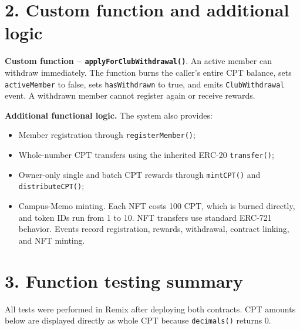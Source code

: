 \documentclass[9pt,a4paper]{article}
\newcommand{\code}[1]{\texttt{\small #1}}
\begin{document}
\section*{2. Custom function and additional logic}
\textbf{Custom function -- \code{applyForClubWithdrawal()}}. An active member can withdraw immediately. The function burns the caller's entire CPT balance, sets \code{activeMember} to false, sets \code{hasWithdrawn} to true, and emits \code{ClubWithdrawal} event. A withdrawn member cannot register again or receive rewards.

\textbf{Additional functional logic.} The system also provides: 

\begin{itemize}
  \item Member registration through \code{registerMember()}; 
  \item Whole-number CPT transfers using the inherited ERC-20 \code{transfer()}; 
  \item Owner-only single and batch CPT rewards through \code{mintCPT()} and \code{distributeCPT()};
  \item Campus-Memo minting. Each NFT costs 100 CPT, which is burned directly, and token IDs run from 1 to 10. NFT transfers use standard ERC-721 behavior. Events record registration, rewards, withdrawal, contract linking, and NFT minting.
\end{itemize}

\section*{3. Function testing summary}
All tests were performed in Remix after deploying both contracts. CPT amounts below are displayed directly as whole CPT because \code{decimals()} returns 0.
\end{document}
